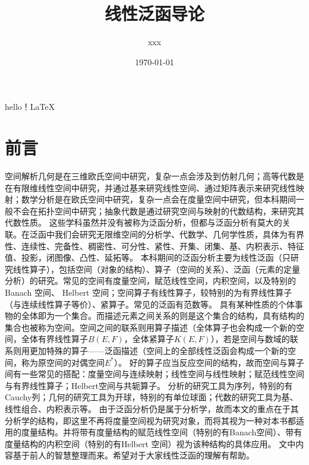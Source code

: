 \documentclass{article}                     %
\title{线性泛函导论}                             %
\author{xxx}
\date{\today}
\numberwithin{equation}{section}            %
\numberwithin{figure}{section}              %
\numberwithin{table}{section}               %
\begin{document}
\maketitle                                  %
hello！LaTeX

\newpage                                    %
\tableofcontents                            %
\newpage                                    %

\section{前言}
空间解析几何是在三维欧氏空间中研究，复杂一点会涉及到仿射几何；高等代数是在有限维线性空间中研究，并通过基来研究线性空间、通过矩阵表示来研究线性映射；数学分析是在欧氏空间中研究，复杂一点会在度量空间中研究，但本科期间一般不会在拓扑空间中研究；抽象代数是通过研究空间与映射的代数结构，来研究其代数性质。
这些学科虽然并没有被称为泛函分析，但都与泛函分析有莫大的关联。在泛函中我们会研究无限维空间的分析学、代数学、几何学性质，具体为有界性、连续性、完备性、稠密性、可分性、紧性、开集、闭集、基、内积表示、特征值、投影，闭图像、凸性、延拓等。
本科期间的泛函分析主要为线性泛函（只研究线性算子），包括空间（对象的结构）、算子（空间的关系）、泛函（元素的定量分析）的研究。常见的空间有度量空间，赋范线性空间，内积空间，以及特别的 Banach 空间、 Helbert 空间；空间算子有线性算子，较特别的为有界线性算子（与连续线性算子等价）、紧算子。常见的泛函有范数等。
具有某种性质的个体事物的全体即为一个集合。而描述元素之间关系的则是这个集合的结构，具有结构的集合也被称为空间。空间之间的联系则用算子描述（全体算子也会构成一个新的空间，全体有界线性算子$B(E,F)$，全体紧算子$K(E,F)$），若是空间与数域的联系则用更加特殊的算子——泛函描述（空间上的全部线性泛函会构成一个新的空间，称为原空间的对偶空间$E^\ast$）。
好的算子应当反应空间的结构，故而空间与算子间有一些常见的搭配：度量空间与连续映射；线性空间与线性映射；赋范线性空间与有界线性算子；Helbert空间与共轭算子。
分析的研究工具为序列，特别的有Cauchy列；几何的研究工具为开球，特别的有单位球面；代数的研究工具为基、线性组合、内积表示等。
由于泛函分析仍是属于分析学，故而本文的重点在于其分析学的结构，即这里不再将度量空间视为研究对象，而将其视为一种对本书都适用的度量结构。并将带有度量结构的赋范线性空间（特别的有Banach空间）、带有度量结构的内积空间（特别的有Helbert 空间）视为该种结构的具体应用。
文中内容基于前人的智慧整理而来。希望对于大家线性泛函的理解有帮助。
\end{document}
